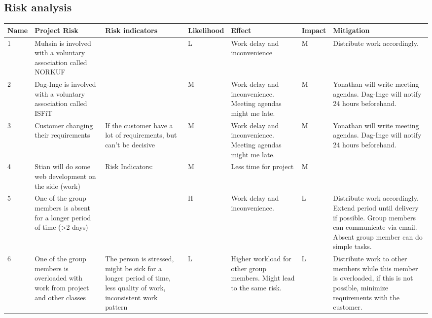 \begin{landscape}

\section{Risk analysis}
	
\begin{table}[htb]
	\centering
    \begin{tabular}{| p{0.75cm} | p{5cm} | p{5cm} | p{2cm} | p{4cm} | p{1cm} | p{4cm} |}
		\hline
			Name   & Project Risk  & Risk indicators  & Likelihood & Effect & Impact & Mitigation \\
		\hline \hline
			1 & Muhsin is involved with a voluntary association called NORKUF &  & L & Work delay and inconvenience & M & Distribute work accordingly. \\

			2 & Dag-Inge is involved with a voluntary association called ISFiT &  & M & Work delay and inconvenience. Meeting agendas might me late. &  M & Yonathan will write meeting agendas. Dag-Inge will notify 24 hours beforehand. \\

			3 & Customer changing their requirements &  If the customer have a lot of requirements, but can’t be decisive & M & Work delay and inconvenience. Meeting agendas might me late. &  M & Yonathan will write meeting agendas. Dag-Inge will notify 24 hours beforehand. \\

			4 & Stian will do some web development on the side (work) & Risk Indicators: & M & Less time for project & M & \\

			5 & One of the group members is absent for a longer period of time (>2 days) &  & H & Work delay and inconvenience. &  L & Distribute work accordingly. Extend period until delivery if possible. Group members can communicate via email. Absent group member can do simple tasks. \\

			6 & One of the group members is overloaded with work from project and other classes &  The person is stressed, might be sick for a longer period of time, less quality of work, inconsistent work pattern & L & Higher workload for other group members. Might lead to the same risk. &  L & Distribute work to other members while this member is overloaded, if this is not possible, minimize requirements with the customer. \\


\end{tabular}
\end{table}
\end{landscape}
